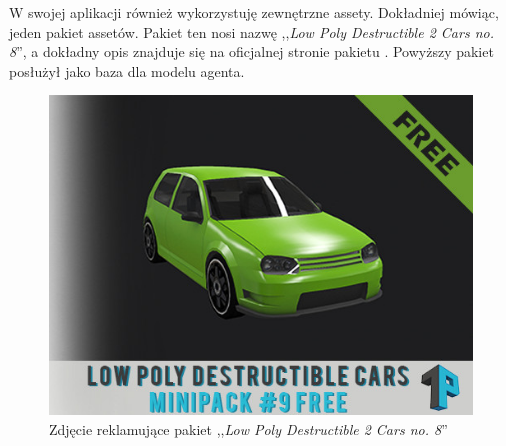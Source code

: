 W swojej aplikacji również wykorzystuję zewnętrzne assety. Dokładniej mówiąc, jeden pakiet assetów. Pakiet ten nosi nazwę ,,\textit{Low Poly Destructible 2 Cars no. 8}'', a dokładny opis znajduje się na oficjalnej stronie pakietu \cite{assets:lowPolyCar}.
Powyższy pakiet posłużył jako baza dla modelu agenta.

\vspace{0.5cm}
\begin{figure}[H]
\centering
\includegraphics[width=15cm]{resources/figures/car_picture.jpg}
\caption{Zdjęcie reklamujące pakiet ,,\textit{Low Poly Destructible 2 Cars no. 8}''}
\label{CarPicture}
\end{figure}

